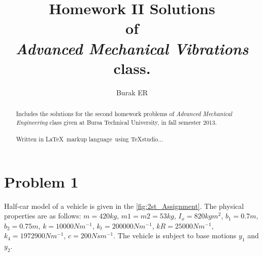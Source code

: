 \documentclass[]{report}
\title{Homework II Solutions \\ of \\ \emph{Advanced Mechanical Vibrations} class.}
\author{Burak ER}
\begin{document}
\maketitle
\begin{abstract}
Includes the solutions for the second homework problems of \emph{Advanced Mechanical Engineering} class given at Bursa Technical University, in fall semester 2013.
\\
\\
Written in \LaTeX ~markup language~using TeXstudio...
\end{abstract}
\section*{Problem 1}
Half-car model of a vehicle is given in the \cref{fig:2st_Assignment}. The physical properties are as follows: $m=420kg$, $m1=m2=53kg$, $I_x=820 kgm^2$, $b_1=0.7m$, $b_2=0.75m$, $k =10000Nm^{-1}$, $k_t=200000 Nm^{-1}$, $kR=25000 Nm^{-1}$, $k_4= 1972900 Nm^{-1}$, $c=200 Nsm^{-1}$. The vehicle is subject to base motions $y_1$ and $y_2$.
\end{document}
